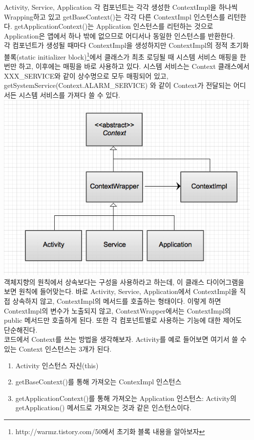 Activity, Service, Application 각 컴포넌트는 각각 생성한 ContextImpl을 하나씩 Wrapping하고 있고 getBaseContext()는 각각 다른 ContextImpl 인스턴스를 리턴한다. getApplicationContext()는 Application 인스턴스를 리턴하는 것으로 Application은 앱에서 하나 밖에 없으므로 어디서나 동일한 인스턴스를 반환한다.\\

각 컴포넌트가 생성될 때마다 ContextImpl을 생성하지만 ContextImpl의 정적 초기화 블록(static initializer block)\footnote{http://warmz.tistory.com/50에서 초기화 블록 내용을 알아보자}에서 클래스가 최초 로딩될 때 시스템 서비스 매핑을 한번만 하고, 이후에는 매핑을 바로 사용하고 있다.
시스템 서비스는 Context 클래스에서 XXX\_SERVICE와 같이 상수명으로 모두 매핑되어 있고, getSystemService(Context.ALARM\_SERVICE) 와 같이 Context가 전달되는 어디서든 시스템 서비스를 가져다 쓸 수 있다.\\

\includegraphics[scale=0.5]{context}\\
객체지향의 원칙에서 상속보다는 구성을 사용하라고 하는데, 이 클래스 다이어그램을 보면 원칙에 들어맞는다.
바로 Activity, Service, Application에서 ContextImpl을 직접 상속하지 않고, ContextImpl의 메서드를 호출하는 형태이다. 이렇게 하면 ContextImpl의 변수가 노출되지 않고, ContextWrapper에서는 ContextImpl의 public 메서드만 호출하게 된다. 또한 각 컴포넌트별로 사용하는 기능에 대한 제어도 단순해진다.\\

코드에서 Context를 쓰는 방법을 생각해보자.
Activity를 예로 들어보면 여기서 쓸 수 있는 Context 인스턴스는 3개가 된다. 
\begin{enumerate}
\item Activity 인스턴스 자신(this)
\item getBaseContext()를 통해 가져오는 ContexImpl 인스턴스
\item getApplicationContext()를 통해 가져오는 Application 인스턴스: Activity의 getApplication() 메서드로 가져오는 것과 같은 인스턴스이다.
\end{enumerate}

